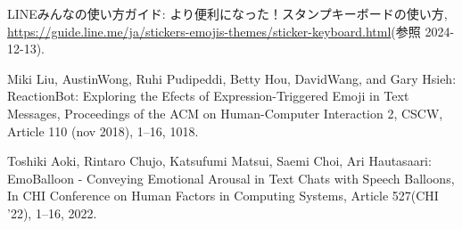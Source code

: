 \documentclass[11pt,a4paper]{ltjsreport}
\makeatletter
\renewcommand{\chapter}{%
    \if@openleft\cleardoublepage\else
    \if@openright\cleardoublepage\else\clearpage\fi\fi
    \global\@topnum\z@
    \if@english \@afterindentfalse \else \@afterindenttrue \fi
    \secdef
    {\@omit@numberfalse\@chapter}%
    {\@omit@numbertrue\@schapter}}
\makeatother
\begin{document}
\begin{thebibliography}{99}
    LINEみんなの使い方ガイド: より便利になった！スタンプキーボードの使い方,
    \url{https://guide.line.me/ja/stickers-emojis-themes/sticker-keyboard.html}(参照 2024-12-13).

    Miki Liu, AustinWong, Ruhi Pudipeddi, Betty Hou, DavidWang, and Gary Hsieh: 
    ReactionBot: Exploring the Efects of Expression-Triggered Emoji in Text Messages, 
    Proceedings of the ACM on Human-Computer Interaction 2, CSCW,
    Article 110 (nov 2018), 1–16, 1018.

    Toshiki Aoki, Rintaro Chujo, Katsufumi Matsui, Saemi Choi, Ari Hautasaari:
    EmoBalloon - Conveying Emotional Arousal in Text Chats with Speech Balloons,
    In CHI Conference on Human Factors in Computing Systems, Article 527(CHI '22), 1–16, 2022.





\end{thebibliography}

\newpage
\appendix         %
\pagestyle{fancy}
\fancyhead{} %
\renewcommand{\chaptermark}[1]{\lhead{付録\ \thechapter\ ~~~#1}{}}
\chead{} %
\rhead{\thepage} %
\lfoot{} %
\cfoot{} %
\renewcommand{\footrulewidth}{0.5pt} %

\titleformat{\chapter}[display]{\huge\bfseries}{付録\ \thechapter}{20pt}{}[]
\end{document}
